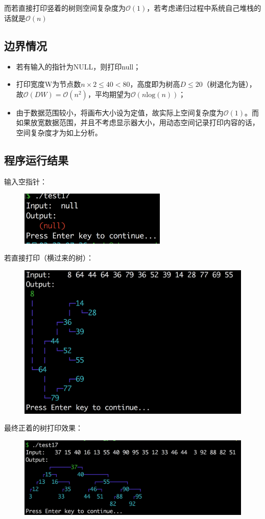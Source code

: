 \documentclass{homework}
\begin{document}
而若直接打印竖着的树则空间复杂度为$\mathcal{O}(1)$，若考虑递归过程中系统自己堆栈的话就是$\mathcal{O}(n)$
\subsection{边界情况}
\begin{itemize}
    \item 若有输入的指针为NULL，则打印null；
    \item 打印宽度W为节点数$n\times 2\leqslant 40<80$，高度即为树高$D\leqslant 20$（树退化为链），故$\mathcal{O}(DW)=\mathcal{O}(n^2)$，平均期望为$\mathcal{O}(n\mathrm{log}(n))$；
    \item 由于数据范围较小，将画布大小设为定值，故实际上空间复杂度为$\mathcal{O}(1)$。而如果放宽数据范围，并且不考虑显示器大小，用动态空间记录打印内容的话，空间复杂度才为如上分析。
\end{itemize}
\subsection{程序运行结果}
输入空指针：
\begin{figure}[H]
    \centering
    \includegraphics[width=7cm]{null.png}
\end{figure}
若直接打印（横过来的树）：
\begin{figure}[H]
    \centering
    \includegraphics[width=0.8\linewidth]{vert.png}
\end{figure}
最终正着的树打印效果：
\begin{figure}[H]
    \centering
    \includegraphics[width=\linewidth]{horz.png}
\end{figure}
\end{document}
